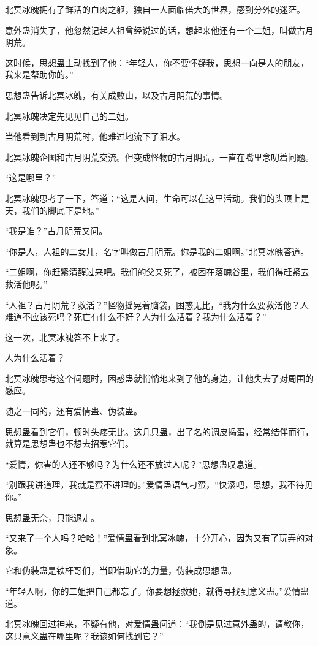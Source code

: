 \begin{this_body}
北冥冰魄拥有了鲜活的血肉之躯，独自一人面临偌大的世界，感到分外的迷茫。

意外蛊消失了，他忽然记起人祖曾经说过的话，想起来他还有一个二姐，叫做古月阴荒。

这时候，思想蛊主动找到了他：“年轻人，你不要怀疑我，思想一向是人的朋友，我来是帮助你的。”

思想蛊告诉北冥冰魄，有关成败山，以及古月阴荒的事情。

北冥冰魄决定先见见自己的二姐。

当他看到到古月阴荒时，他难过地流下了泪水。

北冥冰魄企图和古月阴荒交流。但变成怪物的古月阴荒，一直在嘴里念叨着问题。

“这是哪里？”

北冥冰魄思考了一下，答道：“这是人间，生命可以在这里活动。我们的头顶上是天，我们的脚底下是地。”

“我是谁？”古月阴荒又问。

“你是人，人祖的二女儿，名字叫做古月阴荒。你是我的二姐啊。”北冥冰魄答道。

“二姐啊，你赶紧清醒过来吧。我们的父亲死了，被困在落魄谷里，我们得赶紧去救活他呢。”

“人祖？古月阴荒？救活？”怪物摇晃着脑袋，困惑无比，“我为什么要救活他？人难道不应该死吗？死亡有什么不好？人为什么活着？我为什么活着？”

这一次，北冥冰魄答不上来了。

人为什么活着？

北冥冰魄思考这个问题时，困惑蛊就悄悄地来到了他的身边，让他失去了对周围的感应。

随之一同的，还有爱情蛊、伪装蛊。

思想蛊看到它们，顿时头疼无比。这几只蛊，出了名的调皮捣蛋，经常结伴而行，就算是思想蛊也不想去招惹它们。

“爱情，你害的人还不够吗？为什么还不放过人呢？”思想蛊叹息道。

“别跟我讲道理，我就是蛮不讲理的。”爱情蛊语气刁蛮，“快滚吧，思想，我不待见你。”

思想蛊无奈，只能退走。

“又来了一个人吗？哈哈！”爱情蛊看到北冥冰魄，十分开心，因为又有了玩弄的对象。

它和伪装蛊是铁杆哥们，当即借助它的力量，伪装成思想蛊。

“年轻人啊，你的二姐把自己都忘了。你要想拯救她，就得寻找到意义蛊。”爱情蛊道。

北冥冰魄回过神来，不疑有他，对爱情蛊问道：“我倒是见过意外蛊的，请教你，这只意义蛊在哪里呢？我该如何找到它？”


\end{this_body}
